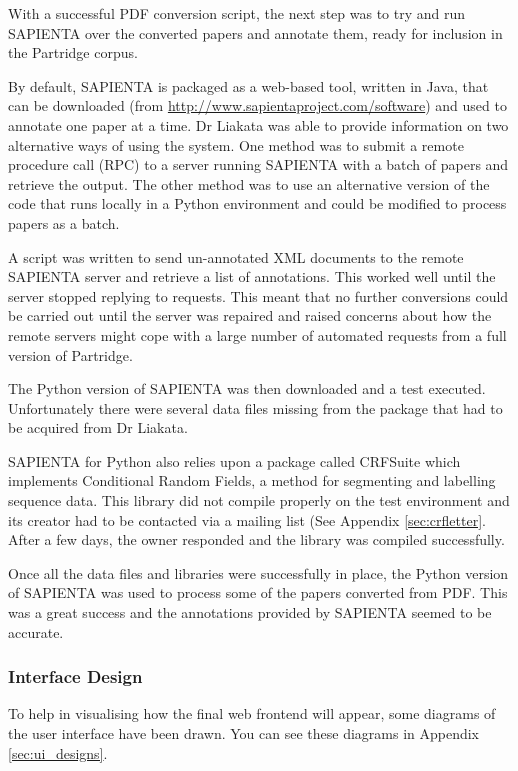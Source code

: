 \documentclass[12pt,a4paper]{article}
\begin{document}
With a successful PDF conversion script, the next step was to try and run
SAPIENTA over the converted papers and annotate them, ready for inclusion in
the Partridge corpus.

By default, SAPIENTA is packaged as a web-based tool, written in Java, that
can be downloaded (from \url{http://www.sapientaproject.com/software}) and used
to annotate one paper at a time. Dr Liakata was able to provide information on
two alternative ways of using the system. One method was to submit a remote
procedure call (RPC) to a server running SAPIENTA with a batch of papers and
retrieve the output. The other method was to use an alternative version of the
code that runs locally in a Python environment and could be modified to process
papers as a batch.

A script was written to send un-annotated XML documents to the remote SAPIENTA
server and retrieve a list of annotations. This worked well until the server
stopped replying to requests. This meant that no further conversions could be
carried out until the server was repaired and raised concerns about how the
remote servers might cope with a large number of automated requests from a
full version of Partridge.

The Python version of SAPIENTA was then downloaded and a test executed.
Unfortunately there were several data files missing from the package that had
to be acquired from Dr Liakata. 

SAPIENTA for Python also relies upon a package called CRFSuite which implements
Conditional Random Fields, a method for segmenting and labelling sequence
data\cite{CRFsuite}. This library did not compile properly on the test
environment and its creator had to be contacted via a mailing list (See
Appendix \ref{sec:crfletter}. After a few days, the owner responded and the
library was compiled successfully.  

Once all the data files and libraries were successfully in place, the Python
version of SAPIENTA was used to process some of the papers converted from PDF.
This was a great success and the annotations provided by SAPIENTA seemed to be
accurate. 

\subsubsection{Interface Design}

To help in visualising how the final web frontend will appear, some diagrams of
the user interface have been drawn. You can see these diagrams in Appendix
\ref{sec:ui_designs}. 
\end{document}

